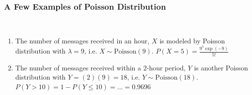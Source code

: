 \documentclass[compress]{beamer}
\begin{document}
\begin{frame}\frametitle{A Few Examples of Poisson Distribution }
\vspace{-.1in}
\\


\vspace{.5in}
{\tiny 
\begin{enumerate}
\item The number of messages received in an hour, $X$ is modeled by
Poisson distribution with $\lambda =  9$, i.e.  $X\sim \text{Poisson}(9)$.
$P(X=5)= \frac{9^5 \exp(-9)}{5!}$
\item The number of messages received within a 2-hour period, $Y$ is
another Poisson distribution with  $Y= (2)(9) =18$, i.e. $Y\sim  \text{Poisson}(18)$.
$P(Y > 10) =1- P(Y\leq 10 )= ...= 0.9696$
\end{enumerate}

}

\end{frame}



%
%
\end{document}
